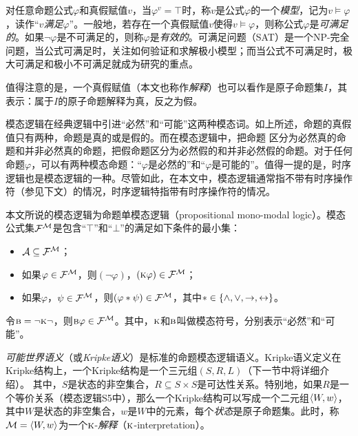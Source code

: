 对任意命题公式$\varphi$和真假赋值$v$，当$\varphi^v=\top$时，称$v$是公式$\varphi$的一个\emph{模型}，记为$v \models \varphi$，读作“$v$\emph{满足}$\varphi$”。一般地，若存在一个真假赋值$v$使得$v\models \varphi$，则称公式$\varphi$是\emph{可满足的}。如果$\neg \varphi$是不可满足的，则称$\varphi$是\emph{有效的}。可满足问题（SAT）是一个NP-完全问题，当公式可满足时，关注如何验证和求解极小模型\cite{DBLP:conf/ijcai/Ben-Eliyahu-Zohary16,DBLP:conf/lpnmr/Ben-Eliyahu-Zohary17,zhangli2021}；而当公式不可满足时，极大可满足和极小不可满足就成为研究的重点\cite{DBLP:conf/ijcai/LeiC18,DBLP:conf/aaai/LeiC20}。

值得注意的是，一个真假赋值（本文也称作{\em 解释}）也可以看作是原子命题集$I$，其表示：属于$I$的原子命题解释为真，反之为假。

模态逻辑在经典逻辑中引进“必然”和“可能”这两种模态词。如上所述，命题的真假值只有两种，命题是真的或是假的。而在模态逻辑中，把命题
区分为必然真的命题和并非必然真的命题，把假命题区分为必然假的和并非必然假的命题。对于任何命题$\varphi$，可以有两种模态命题：“$\varphi$是必然的”和“$\varphi$是可能的”。值得一提的是，时序逻辑也是模态逻辑的一种\cite{DBLP:books/daglib/0023036}。尽管如此，在本文中，模态逻辑通常指不带有时序操作符（参见下文）的情况，时序逻辑特指带有时序操作符的情况。

本文所说的模态逻辑为命题单模态逻辑（propositional mono-modal logic）。模态公式集${\cal F}^{{\cal M}}$是包含“$\top$”和“$\bot$”的满足如下条件的最小集：
\begin{itemize}
	\item ${\cal A} \subseteq {\cal F}^{{\cal M}}$；
	\item 如果$\varphi \in {\cal F}^{{\cal M}}$，则$(\neg \varphi)$，$(\textsc{k} \varphi)\in {\cal F}^{{\cal M}}$；
	\item 如果$\varphi$，$\psi\in {\cal F}^{{\cal M}}$，则$(\varphi * \psi)\in {\cal F}^{{\cal M}}$，其中$*\in \{\wedge,\vee, \rightarrow, \leftrightarrow\}$。
\end{itemize}
令$\textsc{b} = \neg \textsc{k} \neg$，则$\textsc{b} \varphi \in {\cal F}^{{\cal M}}$。其中，$\textsc{k}$和$\textsc{b}$叫做模态符号，分别表示“必然”和“可能”。

\emph{可能世界语义}（或\emph{Kripke语义}）是标准的命题模态逻辑语义\cite{kripke1963semantical}。Kripke语义定义在Kripke结构上，一个Kripke结构是一个三元组$(S,R,L)$（下一节中将详细介绍）。
其中，$S$是状态的非空集合，$R\subseteq S \times S$是可达性关系。特别地，如果$R$是一个等价关系（模态逻辑S5中），那么一个Kripke结构可以写成一个二元组${\langle{W,w}\rangle}$，其中$W$是状态的非空集合，$w$是$W$中的元素，每个{\em 状态}是原子命题集。此时，称${\cal M}={\langle{W,w}\rangle}$为一个$\textsc{k}$-\emph{解释}（$\textsc{k}$-interpretation）\cite{Yan:AIJ:2009}。

